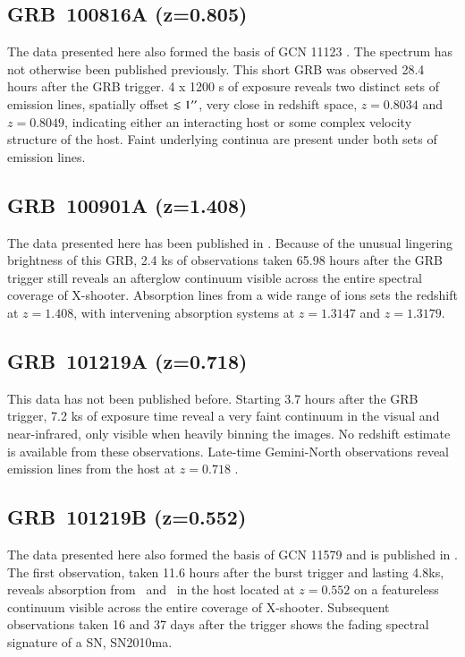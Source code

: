 \documentclass{aa}    %
\begin{document}
\subsection{GRB~100816A (z=0.805)} \label{100816}

The data presented here also formed the basis of GCN 11123 \citep{GCN11123}. The
spectrum has not otherwise been published previously. This short GRB was
observed 28.4 hours after the GRB trigger. 4 x 1200 s of exposure reveals two
distinct sets of emission lines, spatially offset $\lesssim 1 ^{\prime\prime} $, very
close in redshift space, $z=0.8034$ and $z=0.8049$, indicating either an
interacting host or some complex velocity structure of the host. Faint
underlying continua are present under both sets of emission lines.

\subsection{GRB~100901A (z=1.408)} \label{100901}

The data presented here has been published in \citet{Hartoog2013}. Because of
the unusual lingering brightness of this GRB, 2.4 ks of observations taken 65.98
hours after the GRB trigger still reveals an afterglow continuum visible across
the entire spectral coverage of X-shooter. Absorption lines from a wide range of
ions sets the redshift at $z=1.408$, with intervening absorption systems at $z =
1.3147$ and $z = 1.3179$.

\subsection{GRB~101219A (z=0.718)} \label{101219}

This data has not been published before. Starting 3.7 hours after the GRB
trigger, 7.2 ks of exposure time reveal a very faint continuum in the visual and
near-infrared, only visible when heavily binning the images. No redshift
estimate is available from these observations.  Late-time Gemini-North
observations reveal emission lines from the host at $z=0.718$ \citep{GCN11518}.

\subsection{GRB~101219B (z=0.552)} \label{101219}

The data presented here also formed the basis of GCN 11579 \citep{GCN11579} and
is published in \citet{Sparre2011}.	The first observation, taken 11.6 hours
after the burst trigger and lasting 4.8ks, reveals absorption from \mgii~and
\mgi~in the host located at $z = 0.552$ on a featureless continuum visible
across the entire coverage of X-shooter.  Subsequent observations taken 16 and
37 days after the trigger shows the fading spectral signature of a SN, SN2010ma.
\end{document}
